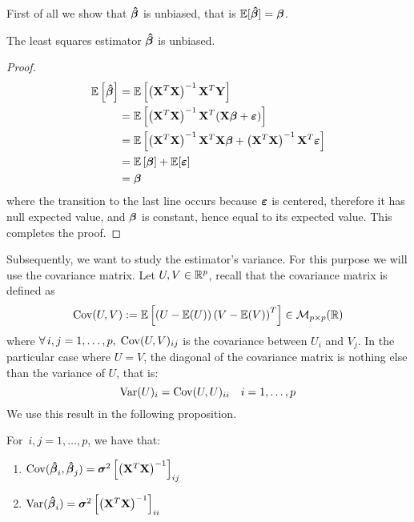 First of all we show that \(\boldsymbol{\hat{\beta}}\) is unbiased, that is $\mathbb{E} [\boldsymbol{\hat{\beta}}] = \boldsymbol{\beta}$.
\begin{proposition}
    The least squares estimator \(\boldsymbol{\hat{\beta}}\) is unbiased.
\end{proposition}
\begin{proof}
    \begin{align*}
        \mathbb{E} \left[ \boldsymbol{\hat{\beta}} \right]
         & = \mathbb{E} \left[ \left(\mathbf{X}^{T} \mathbf{X} \right)^{-1} \mathbf{X}^{T} \mathbf{Y} \right]                                                \\
         & = \mathbb{E} \left[ \left(\mathbf{X}^{T} \mathbf{X} \right)^{-1} \mathbf{X}^{T}(\mathbf{X} \boldsymbol{\beta} + \boldsymbol{\varepsilon})\right]                                    \\
         & = \mathbb{E} \left[ \left(\mathbf{X}^{T} \mathbf{X} \right)^{-1} \mathbf{X}^{T} \mathbf{X} \boldsymbol{\beta} + \left(\mathbf{X}^{T} \mathbf{X}\right)^{-1} \mathbf{X}^{T} \boldsymbol{\varepsilon} \right] \\
         & = \mathbb{E} \left[ \boldsymbol{\beta} \right] + \mathbb{E} [\boldsymbol{\varepsilon}]                                                                      \\
         & = \boldsymbol{\beta}
    \end{align*}
    where the transition to the last line occurs because \(\boldsymbol{\varepsilon}\) is centered, therefore it has null expected value, and \(\boldsymbol{\beta}\) is constant, hence equal to its expected value. This completes the proof.

\end{proof}
Subsequently, we want to study the estimator's variance. For this purpose we will use the covariance matrix. Let \(U, V \in \mathbb{R}^p\), recall that the covariance matrix is defined as
\[
    \operatorname{Cov} (U, V) := \mathbb{E} \left[ \left( U - \mathbb{E} (U) \right) \left( V - \mathbb{E} (V) \right)^T \right] \in \mathcal{M}_{p \times p}(\mathbb{R})
\]
where \(\forall \, i, j = 1, \ldots, p, \; \operatorname{Cov} (U, V)_{ij}\) is the covariance between \( U_i \) and \( V_j\). In the particular case where \( U = V \), the diagonal of the covariance matrix is nothing else than the variance of \( U \), that is:
\[
    \operatorname{Var} (U)_i = \operatorname{Cov} (U, U)_{ii} \quad i = 1, \ldots, p
\]
We use this result in the following proposition.
\begin{proposition}
    For \( \, i, j = 1, \ldots, p\), we have that:
    \begin{enumerate}[label=(\roman*)]
        \item \(\operatorname{Cov} (\boldsymbol{\hat{\beta}}_i, \boldsymbol{\hat{\beta}}_j) = \boldsymbol{\sigma}^{2} \left[ \left( \mathbf{X}^T \mathbf{X} \right)^{-1} \right]_{ij}\)
        \item \(\operatorname{Var} (\boldsymbol{\hat{\beta}}_i) = \boldsymbol{\sigma}^{2} \left[ \left( \mathbf{X}^T \mathbf{X} \right)^{-1} \right]_{ii}\)
    \end{enumerate}
\end{proposition}
